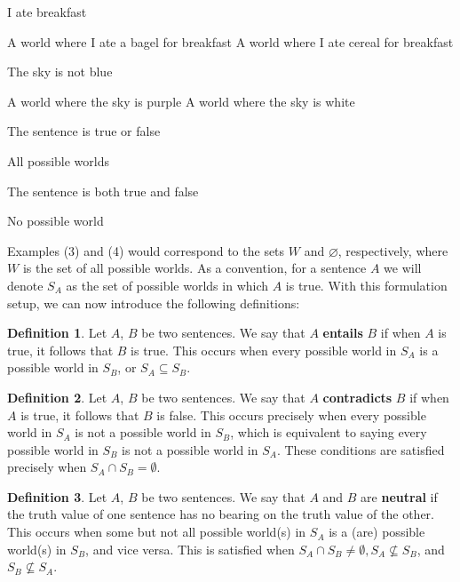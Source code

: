 \documentclass[a4paper, 12pt]{article}
\theoremstyle{definition}
\newtheorem{definition}{Definition}[section]
\begin{document}
\begin{exe}
\ex I ate breakfast
	\begin{xlist} 
		\ex A world where I ate a bagel for breakfast
		\ex A world where I ate cereal for breakfast
	\end{xlist}
\ex The sky is not blue
	\begin{xlist} 
		\ex A world where the sky is purple
		\ex A world where the sky is white
	\end{xlist}
\ex The sentence is true or false
	\begin{xlist}
		\ex All possible worlds
	\end{xlist}
\ex The sentence is both true and false
\begin{xlist}
	\ex No possible world
\end{xlist}
\end{exe}

Examples (3) and (4) would correspond to the sets $W$ and $\varnothing$, respectively, where $W$ is the set of all possible worlds. As a convention, for a sentence $A$ we will denote $S_A$ as the set of possible worlds in which $A$ is true. With this formulation setup, we can now introduce the following definitions:

\begin{definition}
Let $A$, $B$ be two sentences. We say that $A$ \textbf{entails} $B$ if when $A$ is true, it follows that $B$ is true. This occurs when every possible world in $S_A$ is a possible world in $S_B$, or $S_A \subseteq S_B$. \end{definition}

\begin{definition}
	Let $A$, $B$ be two sentences. We say that $A$ \textbf{contradicts} $B$ if when $A$ is true, it follows that $B$ is false. This occurs precisely when every possible world in $S_A$ is not a possible world in $S_B$, which is equivalent to saying every possible world in $S_B$ is not a possible world in $S_A$. These conditions are satisfied precisely when $S_A \cap S_B = \emptyset$.
\end{definition}

\begin{definition}
	Let $A$, $B$ be two sentences. We say that $A$ and $B$ are \textbf{neutral} if the truth value of one sentence has no bearing on the truth value of the other. This occurs when some but not all possible world(s) in $S_A$ is a (are) possible world(s) in $S_B$, and vice versa. This is satisfied when $S_A \cap S_B \neq \emptyset, S_A \nsubseteq S_B$, and $S_B \nsubseteq S_A$. \end{definition}
\end{document}
